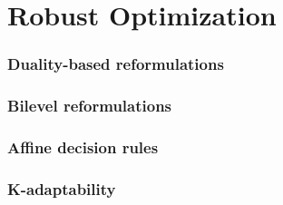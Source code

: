 \part{Robust Optimization}

\label{chapter:robust:modeling}


\section{Duality-based reformulations}
\section{Bilevel reformulations}




\section{Affine decision rules}
\section{K-adaptability}
